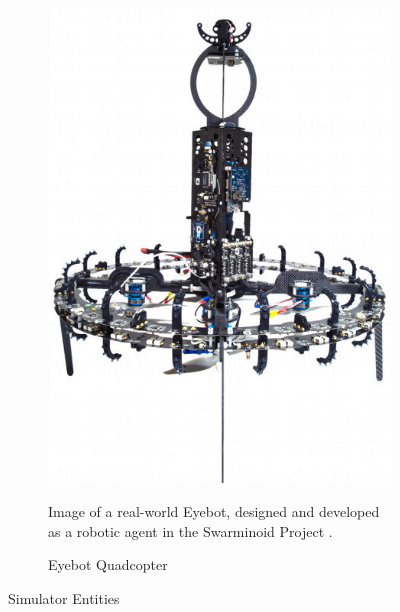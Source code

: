 \documentclass{report}
\begin{document}
\begin{figure}
\begin{subfigure}[b]{0.4\textwidth}
		\includegraphics[width=\textwidth]{images/EyebotCarbonFrame}
		\caption{Eyebot Quadcopter}
		\label{fig:eyebot_hardware}
		{Image of a real-world Eyebot, designed and developed as a robotic agent in the Swarminoid Project \cite{Dorigo2013}}.
	\end{subfigure}
	\caption{Simulator Entities}
	\label{fig:sim_orig}
\end{figure}
\end{document}
